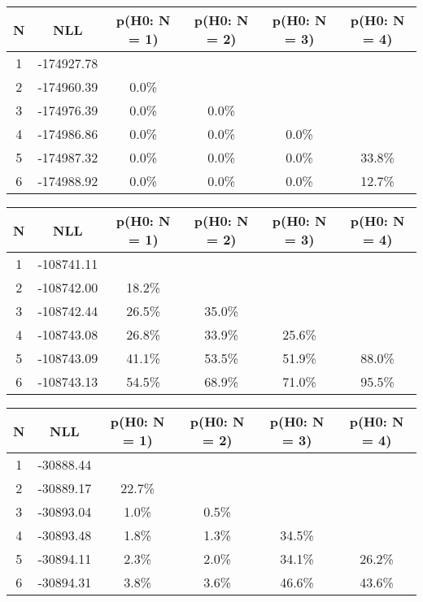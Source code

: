 \begin{table}[htb]
	\begin{center}
{\footnotesize\renewcommand{\arraystretch}{1.4}
		\begin{tabular}{cc||cccc}
			N & NLL & p(H0: N = 1) & p(H0: N = 2) & p(H0: N = 3) & p(H0: N = 4)\\ 
		\hline
1 & -174927.78 & & & & \\
2 & -174960.39 & 0.0\% & & & \\
3 & -174976.39 & 0.0\% & 0.0\% & & \\
4 & -174986.86 & 0.0\% & 0.0\% & 0.0\% & \\
5 & -174987.32 & 0.0\% & 0.0\% & 0.0\% & 33.8\% \\
6 & -174988.92 & 0.0\% & 0.0\% & 0.0\% & 12.7\% \\
	\end{tabular}
		\label{tab:lab}
	}
	\end{center}\end{table}

\begin{table}[htb]
	\begin{center}
{\footnotesize\renewcommand{\arraystretch}{1.4}
		\begin{tabular}{cc||cccc}
			N & NLL & p(H0: N = 1) & p(H0: N = 2) & p(H0: N = 3) & p(H0: N = 4)\\ 
		\hline
1 & -108741.11 & & & & \\
2 & -108742.00 & 18.2\% & & & \\
3 & -108742.44 & 26.5\% & 35.0\% & & \\
4 & -108743.08 & 26.8\% & 33.9\% & 25.6\% & \\
5 & -108743.09 & 41.1\% & 53.5\% & 51.9\% & 88.0\% \\
6 & -108743.13 & 54.5\% & 68.9\% & 71.0\% & 95.5\% \\
	\end{tabular}
		\label{tab:lab}
	}
	\end{center}\end{table}

\begin{table}[htb]
	\begin{center}
{\footnotesize\renewcommand{\arraystretch}{1.4}
		\begin{tabular}{cc||cccc}
			N & NLL & p(H0: N = 1) & p(H0: N = 2) & p(H0: N = 3) & p(H0: N = 4)\\ 
		\hline
1 & -30888.44 & & & & \\
2 & -30889.17 & 22.7\% & & & \\
3 & -30893.04 & 1.0\% & 0.5\% & & \\
4 & -30893.48 & 1.8\% & 1.3\% & 34.5\% & \\
5 & -30894.11 & 2.3\% & 2.0\% & 34.1\% & 26.2\% \\
6 & -30894.31 & 3.8\% & 3.6\% & 46.6\% & 43.6\% \\
	\end{tabular}
		\label{tab:lab}
	}
	\end{center}\end{table}

